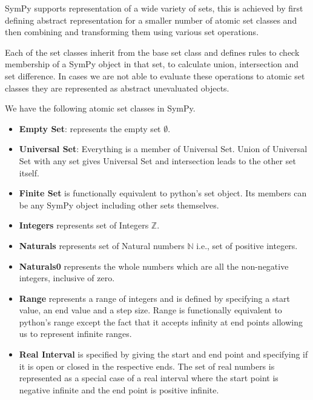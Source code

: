 
SymPy supports representation of a wide variety of sets, this is achieved by
first defining abstract representation for a smaller number of atomic set
classes and then combining and transforming them using various set operations.

Each of the set classes inherit from the base set class and defines rules to
check membership of a SymPy object in that set, to calculate union,
intersection and set difference. In cases we are not able to evaluate these
operations to atomic set classes they are represented as abstract unevaluated
objects.


We have the following atomic set classes in SymPy.

\begin{itemize}

    \item \textbf{Empty Set}: represents the empty set $\emptyset$.

    \item \textbf{Universal Set}: Everything is a member of Universal Set.
        Union of Universal Set with any set gives Universal Set and
        intersection leads to the other set itself.

    \item \textbf{Finite Set} is functionally equivalent to python's set
        object. Its members can be any SymPy object including other sets
        themselves.

    \item \textbf{Integers} represents set of Integers $\mathbb{Z}$.

    \item \textbf{Naturals} represents set of Natural numbers $\mathbb{N}$ i.e.,
        set of positive integers.

    \item \textbf{Naturals0} represents the whole numbers which are all the
        non-negative integers, inclusive of zero.

    \item \textbf{Range} represents a range of integers and is defined by
        specifying a start value, an end value and a step size. Range is
        functionally equivalent to python's range except the fact that it
        accepts infinity at end points allowing us to represent infinite
        ranges.


    \item \textbf{Real Interval} is specified by giving the start and end point
        and specifying if it is open or closed in the respective ends. The set
        of real numbers is represented as a special case of a real interval
        where the start point is negative infinite and the end point is
        positive infinite.


\end{itemize}


